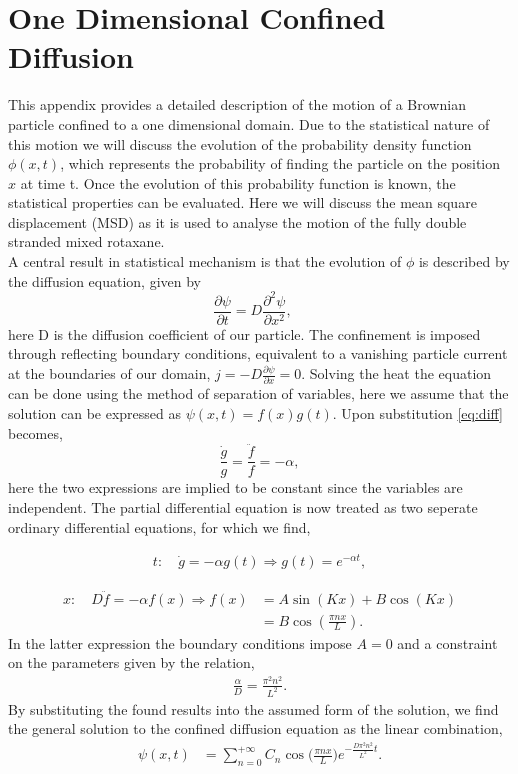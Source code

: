 \chapter{One Dimensional Confined Diffusion}

This appendix provides a detailed description of the motion of a Brownian particle
confined to a one dimensional domain. Due to the statistical nature of this motion we
will discuss the evolution of the probability density function $\phi(x,t)$, which
represents the probability of finding the particle on the position $x$ at time t.
Once the evolution of this probability function is known, the statistical properties can
be evaluated. Here we will discuss the mean square displacement (MSD) as it is used to
analyse the motion of the fully double stranded mixed rotaxane.\\
A central result in statistical mechanism is that the evolution of
$\phi$ is  described by the diffusion equation, given by
\begin{equation}
  \frac{\partial \psi}{\partial t} =  D \frac{\partial^2 \psi}{\partial x^2}, \quad
  \label{eq:diff}
\end{equation}
here D is the diffusion coefficient of our particle.
The confinement is imposed through reflecting boundary conditions, equivalent to a
vanishing particle current at the boundaries of our domain, $j = - D \frac{\partial
\psi}{\partial x} = 0$. Solving the heat the equation can be done using the method of
separation of variables, here we assume that the solution can be expressed as $ \psi(x,t)
= f(x)g(t)$. Upon substitution \ref{eq:diff} becomes,
\begin{equation}
  \frac{\dot{g}}{g} = \frac{\ddot{f}}{f} = - \alpha,
\end{equation}
here the two expressions are implied to be constant since the variables are independent.
The partial differential equation is now treated as two seperate ordinary differential
equations, for which we find,

\begin{align}
t:\quad \dot{g} = - \alpha g(t) \Rightarrow g(t) = e^{-\alpha t},
\end{align}

\begin{align}
  x:\quad D \ddot{f} = - \alpha f(x) \Rightarrow f(x) &= A \sin(K x) + B \cos(Kx)\\
  &= B \cos(\frac{\pi n x}{L}).
\end{align}
In the latter expression the boundary conditions impose $A=0$ and a constraint on the
parameters given by the relation,
\begin{align}
  \frac{\alpha}{D} = \frac{\pi^2 n^2}{L^2}.
\end{align}
By substituting the found results into the assumed form of the solution, we find the
general solution to the confined diffusion equation as the linear combination,
\begin{align}
  \psi(x,t) &= \sum_{n=0}^{+\infty} C_n \cos\Big(\frac{\pi n x}{L}\Big) e^{- \frac{D\pi^2
  n^2}{L^2}t}.
\end{align}


